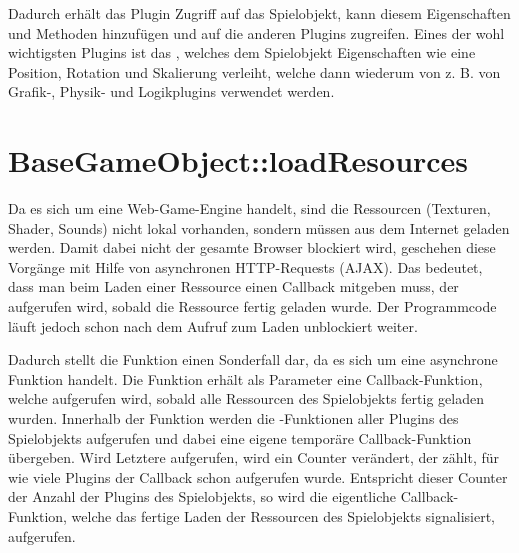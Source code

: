 Dadurch erhält das Plugin Zugriff auf das Spielobjekt, kann diesem Eigenschaften und Methoden hinzufügen und auf die anderen Plugins zugreifen. Eines der wohl wichtigsten Plugins ist das , welches dem Spielobjekt Eigenschaften wie eine Position, Rotation und Skalierung verleiht, welche dann wiederum von z. B. von Grafik-, Physik- und Logikplugins verwendet werden.


\section{BaseGameObject::loadResources}

Da es sich um eine Web-Game-Engine handelt, sind die Ressourcen (Texturen, Shader, Sounds) nicht lokal vorhanden, sondern müssen aus dem Internet geladen werden. Damit dabei nicht der gesamte Browser blockiert wird, geschehen diese Vorgänge mit Hilfe von asynchronen HTTP-Requests (AJAX). Das bedeutet, dass man beim Laden einer Ressource einen Callback mitgeben muss, der aufgerufen wird, sobald die Ressource fertig geladen wurde. Der Programmcode läuft jedoch schon nach dem Aufruf zum Laden unblockiert weiter.

Dadurch stellt die Funktion  einen Sonderfall dar, da es sich um eine asynchrone Funktion handelt. Die Funktion erhält als Parameter eine Callback-Funktion, welche aufgerufen wird, sobald alle Ressourcen des Spielobjekts fertig geladen wurden. Innerhalb der Funktion werden die -Funktionen aller Plugins des Spielobjekts aufgerufen und dabei eine eigene temporäre Callback-Funktion übergeben. Wird Letztere aufgerufen, wird ein Counter verändert, der zählt, für wie viele Plugins der Callback schon aufgerufen wurde. Entspricht dieser Counter der Anzahl der Plugins des Spielobjekts, so wird die eigentliche Callback-Funktion, welche das fertige Laden der Ressourcen des Spielobjekts signalisiert, aufgerufen.

